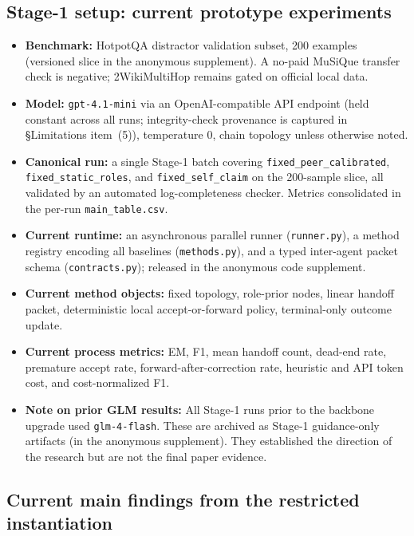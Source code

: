 \documentclass[11pt]{article}
\begin{document}
\subsection{Stage-1 setup: current prototype experiments}

\begin{itemize}[leftmargin=*,itemsep=0pt,topsep=2pt]
  \item \textbf{Benchmark:} HotpotQA \citep{yang2018hotpotqa} distractor validation subset, 200 examples (versioned slice in the anonymous supplement). A no-paid MuSiQue \citep{trivedi2022musique} transfer check is negative; 2WikiMultiHop \citep{ho20202wikimultihop} remains gated on official local data.
  \item \textbf{Model:} \texttt{gpt-4.1-mini} via an OpenAI-compatible API endpoint (held constant across all runs; integrity-check provenance is captured in \S Limitations item~(5)), temperature 0, chain topology unless otherwise noted.
  \item \textbf{Canonical run:} a single Stage-1 batch covering \texttt{fixed\_peer\_calibrated}, \texttt{fixed\_static\_roles}, and \texttt{fixed\_self\_claim} on the 200-sample slice, all validated by an automated log-completeness checker. Metrics consolidated in the per-run \texttt{main\_table.csv}.
  \item \textbf{Current runtime:} an asynchronous parallel runner (\texttt{runner.py}), a method registry encoding all baselines (\texttt{methods.py}), and a typed inter-agent packet schema (\texttt{contracts.py}); released in the anonymous code supplement.
  \item \textbf{Current method objects:} fixed topology, role-prior nodes, linear handoff packet, deterministic local accept-or-forward policy, terminal-only outcome update.
  \item \textbf{Current process metrics:} EM, F1, mean handoff count, dead-end rate, premature accept rate, forward-after-correction rate, heuristic and API token cost, and cost-normalized F1.
  \item \textbf{Note on prior GLM results:} All Stage-1 runs prior to the backbone upgrade used \texttt{glm-4-flash}. These are archived as Stage-1 guidance-only artifacts (in the anonymous supplement). They established the direction of the research but are not the final paper evidence.
\end{itemize}

\subsection{Current main findings from the restricted instantiation}
\end{document}
